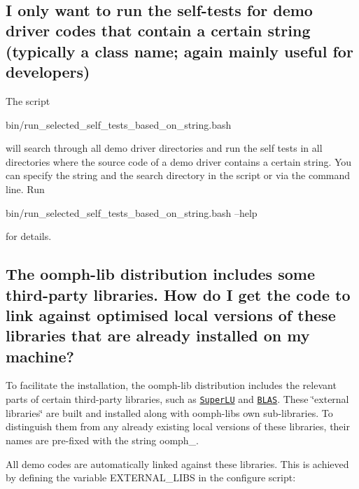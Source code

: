 ~\newline
~\newline




\hypertarget{index_grep_run}{}\subsection{I only want to run the self-\/tests for demo driver codes that contain a certain string (typically a class name; again mainly useful for developers)}\label{index_grep_run}
The script 
\begin{DoxyCode}
bin/run\_selected\_self\_tests\_based\_on\_string.bash
\end{DoxyCode}
 will search through all demo driver directories and run the self tests in all directories where the source code of a demo driver contains a certain string. You can specify the string and the search directory in the script or via the command line. Run 
\begin{DoxyCode}
bin/run\_selected\_self\_tests\_based\_on\_string.bash --help
\end{DoxyCode}
 for details.



\hypertarget{index_link}{}\subsection{The oomph-\/lib distribution includes some third-\/party libraries. How do I get the code to link against optimised local versions of these libraries that are already installed on my machine?}\label{index_link}
To facilitate the installation, the oomph-\/lib distribution includes the relevant parts of certain third-\/party libraries, such as \href{http://crd.lbl.gov/~xiaoye/SuperLU}{\tt Super\+LU} and \href{http://www.netlib.org/blas/}{\tt B\+L\+AS}. These \char`\"{}external libraries\char`\"{} are built and installed along with {\ttfamily oomph-\/lib\textquotesingle{}s} own sub-\/libraries. To distinguish them from any already existing local versions of these libraries, their names are pre-\/fixed with the string {\ttfamily oomph\+\_\+}.

All demo codes are automatically linked against these libraries. This is achieved by defining the variable {\ttfamily E\+X\+T\+E\+R\+N\+A\+L\+\_\+\+L\+I\+BS} in the {\ttfamily configure} script\+:


